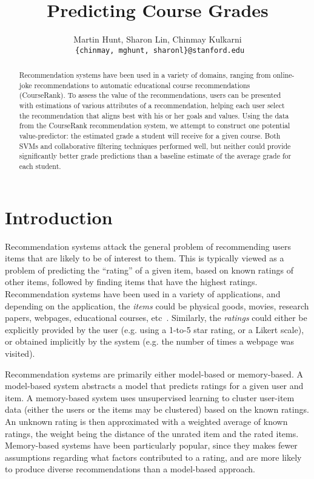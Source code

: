 \documentclass{article} %
\title{Predicting Course Grades}
\author{
Martin Hunt, Sharon Lin, Chinmay Kulkarni \\
\texttt{ \{chinmay, mghunt, sharonl\}@stanford.edu}
}
\begin{document}
\maketitle

\begin{abstract}
Recommendation systems have been used in a variety of domains, ranging from online-joke recommendations to automatic educational course recommendations (CourseRank).
To assess the value of the recommendations, users can be presented with estimations of various attributes of a recommendation, helping each user select the recommendation that aligns best with his or her goals and values.  Using the data from the CourseRank recommendation system, we attempt to construct one potential value-predictor: the estimated grade a student will receive for a given course.  Both SVMs and collaborative filtering techniques performed well, but neither could provide significantly better grade predictions than a baseline estimate of the average grade for each student.
\end{abstract}

\section{Introduction}
\label{sec:intro}
Recommendation systems attack the general problem of recommending users items that are likely to be of interest to them. This is typically viewed as a problem of predicting the ``rating'' of a given item, based on known ratings of other items, followed by finding items that have the highest ratings. Recommendation systems have been used in a variety of applications, and depending on the application, the \textit{items} could be physical goods, movies, research papers, webpages, educational courses, etc~\cite{schafer1999recommender}. Similarly, the \textit{ratings} could either be explicitly provided by the user (e.g. using a 1-to-5 star rating, or a Likert scale), or obtained implicitly by the system (e.g. the number of times a webpage was visited).

Recommendation systems are primarily either model-based or memory-based. A model-based system abstracts a model that predicts ratings for a given user and item. A memory-based system uses unsupervised learning to cluster user-item data (either the users or the items may be clustered) based on the known ratings. An unknown rating is then approximated with a weighted average of known ratings, the weight being the distance of the unrated item and the rated items. Memory-based systems have been particularly popular, since they makes fewer assumptions regarding what factors contributed to a rating, and are more likely to produce diverse recommendations than a model-based approach. 
\end{document}
